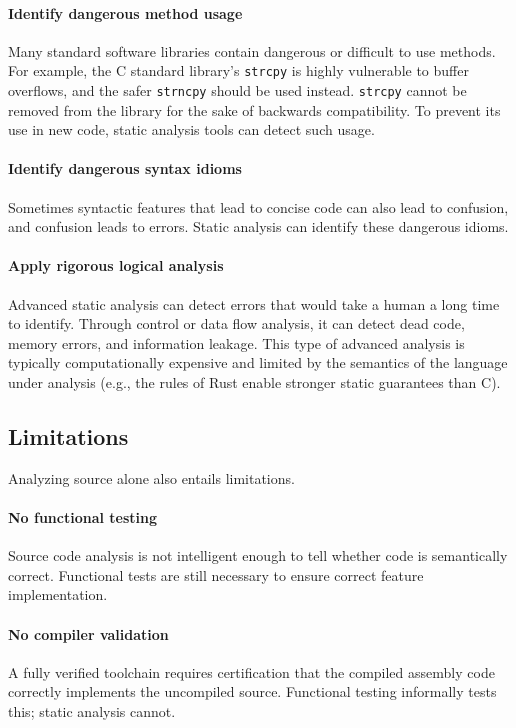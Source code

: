 \documentclass[journal]{IEEEtran}
\def\tt#1{\mbox{\texttt{#1}}}
\begin{document}
\paragraph{Identify dangerous method usage} Many standard software libraries contain dangerous or
difficult to use methods. For example, the C standard library's \tt{strcpy} is highly vulnerable to
buffer overflows, and the safer \tt{strncpy} should be used instead. \tt{strcpy} cannot be removed
from the library for the sake of backwards compatibility. To prevent its use in new code, static
analysis tools can detect such usage.

\paragraph{Identify dangerous syntax idioms} Sometimes syntactic features that lead to concise code
can also lead to confusion, and confusion leads to errors. Static analysis can identify these
dangerous idioms.

\paragraph{Apply rigorous logical analysis} Advanced static analysis can detect errors that would
take a human a long time to identify. Through control or data flow analysis, it can detect dead
code, memory errors, and information leakage. This type of advanced analysis is typically
computationally expensive and limited by the semantics of the language under analysis (e.g., the
rules of Rust enable stronger static guarantees than C).

\subsection{Limitations}

Analyzing source alone also entails limitations.

\paragraph{No functional testing} Source code analysis is not intelligent enough to tell whether
code is semantically correct. Functional tests are still necessary to ensure correct feature
implementation.

\paragraph{No compiler validation} A fully verified toolchain requires certification that the
compiled assembly code correctly implements the uncompiled source. Functional testing informally
tests this; static analysis cannot.
\end{document}
